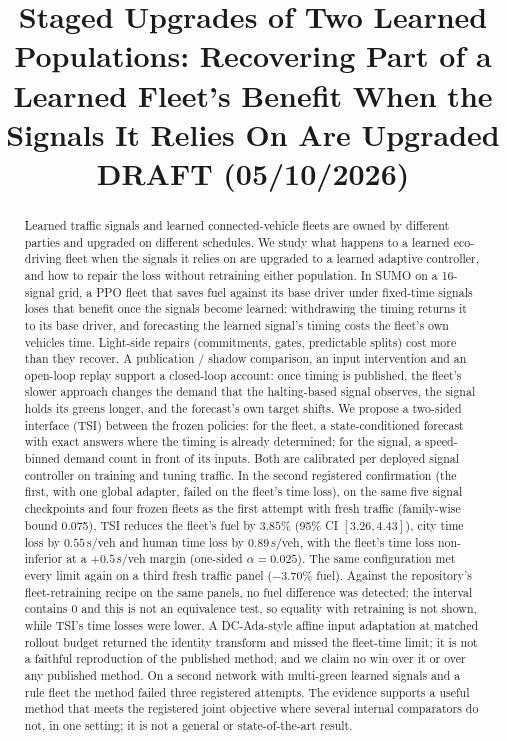\documentclass[11pt]{article}
\title{Staged Upgrades of Two Learned Populations: Recovering Part of a Learned Fleet's Benefit When the Signals It Relies On Are Upgraded\\[4pt]
\large DRAFT (05/10/2026)}
\date{}
\begin{document}
\maketitle

\begin{abstract}
Learned traffic signals and learned connected-vehicle fleets are owned by different parties and upgraded on different schedules. We study
what happens to a learned eco-driving fleet when the signals it relies on are upgraded to a learned adaptive controller, and how to repair
the loss without retraining either population. In SUMO on a 16-signal grid, a PPO fleet that saves fuel against its base driver under
fixed-time signals loses that benefit once the signals become learned: withdrawing the timing returns it to its base driver, and
forecasting the learned signal's timing costs the fleet's own vehicles time. Light-side repairs (commitments, gates, predictable splits)
cost more than they recover. A publication / shadow comparison, an input intervention and an open-loop replay support a closed-loop
account: once timing is published, the fleet's slower approach changes the demand that the halting-based signal observes, the signal holds
its greens longer, and the forecast's own target shifts. We propose a two-sided interface (TSI) between the frozen policies: for the fleet,
a state-conditioned forecast with exact answers where the timing is already determined; for the signal, a speed-binned demand count in front
of its inputs. Both are calibrated per deployed signal controller on training and tuning traffic. In the second registered confirmation
(the first, with one global adapter, failed on the fleet's time loss), on the same five signal checkpoints and four frozen fleets as the
first attempt with fresh traffic (family-wise bound 0.075), TSI reduces the fleet's fuel by $3.85\%$ (95\% CI $[3.26, 4.43]$), city time
loss by $0.55$\,s/veh and human time loss by $0.89$\,s/veh, with the fleet's time loss non-inferior at a $+0.5$\,s/veh margin (one-sided
$\alpha=0.025$). The same configuration met every limit again on a third fresh traffic panel ($-3.70\%$ fuel). Against the repository's
fleet-retraining recipe on the same panels, no fuel difference was detected; the interval contains 0 and this is not an equivalence test,
so equality with retraining is not shown, while TSI's time losses were lower. A DC-Ada-style affine input adaptation at matched rollout
budget returned the identity transform and missed the fleet-time limit; it is not a faithful reproduction of the published method, and we
claim no win over it or over any published method. On a second network with multi-green learned signals and a rule fleet the method failed
three registered attempts. The evidence supports a useful method that meets the registered joint objective where several internal
comparators do not, in one setting; it is not a general or state-of-the-art result.
\end{abstract}
\end{document}
